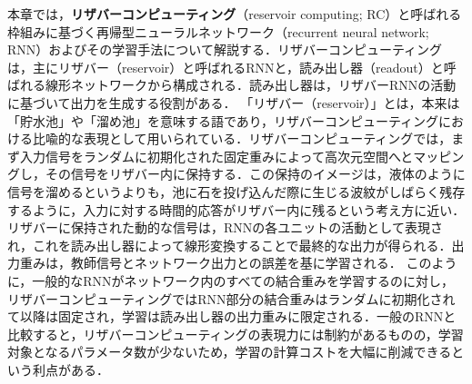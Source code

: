本章では，\textbf{リザバーコンピューティング}（reservoir computing; RC）と呼ばれる枠組みに基づく再帰型ニューラルネットワーク（recurrent neural network; RNN）およびその学習手法について解説する．リザバーコンピューティングは，主にリザバー（reservoir）と呼ばれるRNNと，読み出し器（readout）と呼ばれる線形ネットワークから構成される．読み出し器は，リザバーRNNの活動に基づいて出力を生成する役割がある．
「リザバー（reservoir）」とは，本来は「貯水池」や「溜め池」を意味する語であり，リザバーコンピューティングにおける比喩的な表現として用いられている．リザバーコンピューティングでは，まず入力信号をランダムに初期化された固定重みによって高次元空間へとマッピングし，その信号をリザバー内に保持する．この保持のイメージは，液体のように信号を溜めるというよりも，池に石を投げ込んだ際に生じる波紋がしばらく残存するように，入力に対する時間的応答がリザバー内に残るという考え方に近い．リザバーに保持された動的な信号は，RNNの各ユニットの活動として表現され，これを読み出し器によって線形変換することで最終的な出力が得られる．出力重みは，教師信号とネットワーク出力との誤差を基に学習される．
このように，一般的なRNNがネットワーク内のすべての結合重みを学習するのに対し，リザバーコンピューティングではRNN部分の結合重みはランダムに初期化されて以降は固定され，学習は読み出し器の出力重みに限定される．一般のRNNと比較すると，リザバーコンピューティングの表現力には制約があるものの，学習対象となるパラメータ数が少ないため，学習の計算コストを大幅に削減できるという利点がある．
